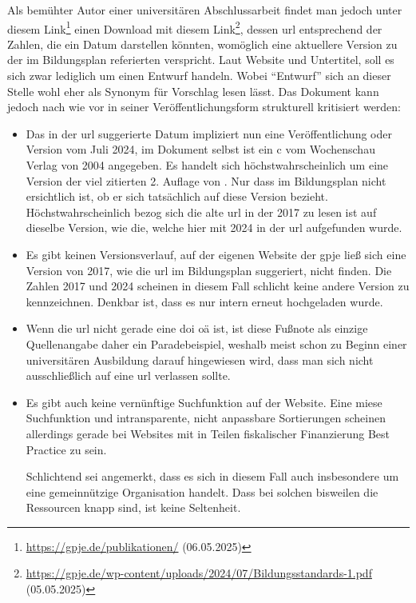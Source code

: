 Als bemühter Autor einer universitären Abschlussarbeit findet man jedoch unter diesem Link\footnote{\url{https://gpje.de/publikationen/} (06.05.2025)} einen Download mit diesem Link\footnote{\url{https://gpje.de/wp-content/uploads/2024/07/Bildungsstandards-1.pdf} (05.05.2025)}, dessen \gls{url} entsprechend der Zahlen, die ein Datum darstellen könnten, womöglich eine aktuellere Version zu der im Bildungsplan \autocite[][9]{bplan} referierten verspricht. Laut Website und Untertitel, soll es sich zwar lediglich um einen Entwurf handeln. Wobei \enquote{Entwurf} sich an dieser Stelle wohl eher als Synonym für Vorschlag lesen lässt.  Das Dokument kann jedoch nach wie vor in seiner Veröffentlichungsform strukturell kritisiert werden:
\begin{itemize}
    \item Das in der \gls{url} suggerierte Datum impliziert nun eine Veröffentlichung oder Version vom Juli 2024, im Dokument selbst ist ein \gls{c} vom Wochenschau Verlag von 2004 angegeben. Es handelt sich höchstwahrscheinlich um eine Version der viel zitierten 2. Auflage von \citeyear[]{gpje2004}. Nur dass im Bildungsplan nicht ersichtlich ist, ob er sich tatsächlich auf diese Version bezieht. Höchstwahrscheinlich bezog sich die alte \gls{url} in der 2017 zu lesen ist auf dieselbe Version, wie die, welche hier mit 2024 in der \gls{url} aufgefunden wurde. 
    
    
    \item Es gibt keinen Versionsverlauf, auf der eigenen Website der \gls{gpje} ließ sich eine Version von 2017, wie die \gls{url} im Bildungsplan \autocite[][9]{bplan} suggeriert, nicht finden. Die Zahlen 2017 und 2024 scheinen in diesem Fall schlicht keine andere Version zu kennzeichnen. Denkbar ist, dass es nur intern erneut hochgeladen wurde.

    \item Wenn die \gls{url} nicht gerade eine \gls{doi} \gls{oä} ist, ist diese Fußnote als einzige Quellenangabe daher ein Paradebeispiel, weshalb meist schon zu Beginn einer universitären Ausbildung darauf hingewiesen wird, dass man sich nicht ausschließlich auf eine \gls{url} verlassen sollte. 
    
    \item Es gibt auch keine vernünftige Suchfunktion auf der Website. Eine miese Suchfunktion und intransparente, nicht anpassbare Sortierungen scheinen allerdings gerade bei Websites mit in Teilen fiskalischer Finanzierung Best Practice zu sein.
    
    Schlichtend sei angemerkt, dass es sich in diesem Fall auch insbesondere um eine gemeinnützige Organisation handelt. Dass bei solchen bisweilen die Ressourcen knapp sind, ist keine Seltenheit.  
    

\end{itemize}
